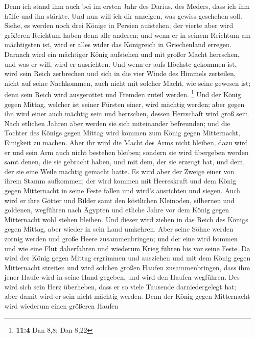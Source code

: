  Denn ich stand ihm auch bei im ersten Jahr des Darius,
des Meders, dass ich ihm hülfe und ihn stärkte.  Und nun
will ich dir anzeigen, was gewiss geschehen soll. Siehe, es werden noch
drei Könige in Persien aufstehen; der vierte aber wird größeren Reichtum
haben denn alle anderen; und wenn er in seinem Reichtum am mächtigsten
ist, wird er alles wider das Königreich in Griechenland erregen.
 Darnach wird ein mächtiger König aufstehen und mit großer
Macht herrschen, und was er will, wird er ausrichten.  Und
wenn er aufs Höchste gekommen ist, wird sein Reich zerbrechen und sich
in die vier Winde des Himmels zerteilen, nicht auf seine Nachkommen,
auch nicht mit solcher Macht, wie seine gewesen ist; denn sein Reich
wird ausgerottet und Fremden zuteil werden. \footnote{\textbf{11:4} Dan
  8,8; Dan 8,22}  Und der König gegen Mittag, welcher ist
seiner Fürsten einer, wird mächtig werden; aber gegen ihn wird einer
auch mächtig sein und herrschen, dessen Herrschaft wird groß sein.
 Nach etlichen Jahren aber werden sie sich miteinander
befreunden; und die Tochter des Königs gegen Mittag wird kommen zum
König gegen Mitternacht, Einigkeit zu machen. Aber ihr wird die Macht
des Arms nicht bleiben, dazu wird er und sein Arm auch nicht bestehen
bleiben; sondern sie wird übergeben werden samt denen, die sie gebracht
haben, und mit dem, der sie erzeugt hat, und dem, der sie eine Weile
mächtig gemacht hatte.  Es wird aber der Zweige einer von
ihrem Stamm aufkommen; der wird kommen mit Heereskraft und dem König
gegen Mitternacht in seine Feste fallen und wird's ausrichten und
siegen.  Auch wird er ihre Götter und Bilder samt den
köstlichen Kleinoden, silbernen und goldenen, wegführen nach Ägypten und
etliche Jahre vor dem König gegen Mitternacht wohl stehen bleiben.
 Und dieser wird ziehen in das Reich des Königs gegen
Mittag, aber wieder in sein Land umkehren.  Aber seine
Söhne werden zornig werden und große Heere zusammenbringen; und der eine
wird kommen und wie eine Flut daherfahren und wiederum Krieg führen bis
vor seine Feste.  Da wird der König gegen Mittag
ergrimmen und ausziehen und mit dem König gegen Mitternacht streiten und
wird solchen großen Haufen zusammenbringen, dass ihm jener Haufe wird in
seine Hand gegeben,  und wird den Haufen wegführen. Des
wird sich sein Herz überheben, dass er so viele Tausende darniedergelegt
hat; aber damit wird er sein nicht mächtig werden.  Denn
der König gegen Mitternacht wird wiederum einen größeren Haufen
